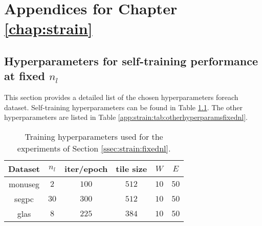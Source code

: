 \chapter{Appendices for Chapter \ref{chap:strain}}
\label{app:strain}

\section{Hyperparameters for self-training performance at fixed $n_l$}
\label{app:strain:sec:expfixednl}
This section provides a detailed list of the chosen hyperparameters foreach dataset. Self-training hyperparameters can be found in Table \ref{app:strain:tab:sthyperparamsfixednl}. The other hyperparameters are listed in Table \ref{app:strain:tab:otherhyperparamsfixednl}.

\begin{table}
    \centering
    \caption{Training hyperparameters used for the experiments of Section \ref{ssec:strain:fixednl}.}
    \begin{tabular}{|c|ccccc|}
        \hline
        Dataset & $n_l$ & iter/epoch & tile size & $W$ & $E$ \\
        \hline
        \acrshort{monuseg} & $2$ & $100$ & $512$ & $10$ & $50$ \\
        \acrshort{segpc} & $30$ & $300$ & $512$ & $10$ & $50$ \\
        \acrshort{glas} & $8$ & $225$ & $384$ & $10$ & $50$ \\
        \hline
    \end{tabular}
    \label{app:strain:tab:sthyperparamsfixednl}
\end{table}

